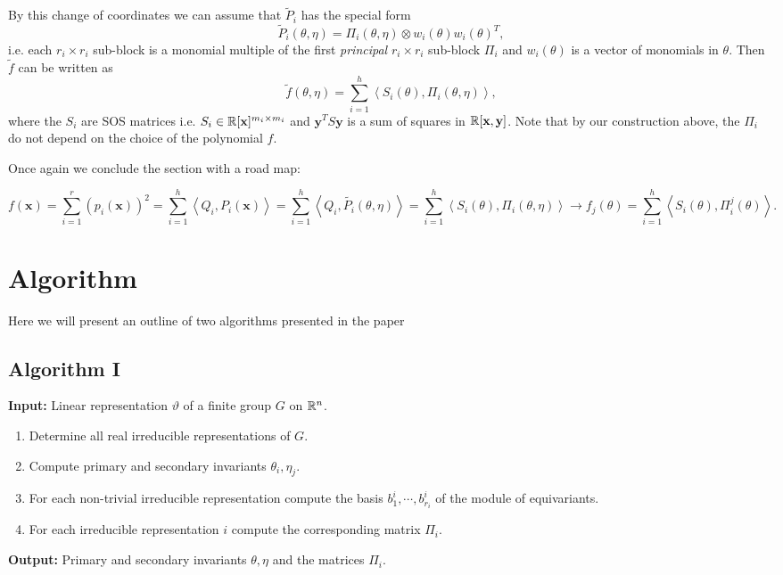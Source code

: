 \documentclass[]{article}
\begin{document}
By this change of coordinates we can assume that $\tilde{P}_i$ has the special form 
\[
    \tilde{P}_i(\theta,\eta)=\Pi_i(\theta,\eta)\otimes w_i(\theta) w_i(\theta)^T,
\]
i.e. each $r_i\times r_i$ sub-block is a monomial multiple of the first \textit{principal} $r_i\times r_i$ sub-block $\Pi_i$ and $w_i(\theta)$ is a vector of monomials in $\theta$. Then $\tilde{f}$ can be written as 
\[
    \tilde{f}(\theta, \eta)=\sum_{i=1}^h\left<S_i(\theta),\Pi_i(\theta,\eta)\right>,
\]
where the $S_i$ are SOS matrices i.e. $S_i\in \mathbb R[\mathbf{x}]^{m_i\times m_i}$ and $\mathbf{y}^TS\textbf{y}$ 
is a sum of squares in $\mathbb R[\textbf{x},\textbf{y}]$. Note that by our construction above, the $\Pi_i$ do not depend on the choice of the polynomial $f$.

Once again we conclude the section with a road map:

\[f(\mathbf{x}) = \sum_{i= 1}^{r} (p_i(\mathbf{x}))^2 
                = \sum_{i=1}^{h}\left<Q_i,P_i(\mathbf{x})\right> 
                = \sum_{i=1}^{h}\left<Q_i,\tilde{P_i}(\theta,\eta)\right>
                = \sum_{i=1}^{h}\left<S_i(\theta),\Pi_i(\theta,\eta)\right> 
                \rightarrow f_j(\theta) = \sum_{i=1}^{h}\left<S_i(\theta),\Pi_i^j(\theta)\right> . \]

\section*{Algorithm}
Here we will present an outline of two algorithms presented in the paper
\subsection*{Algorithm I}


\textbf{Input:} Linear representation $\vartheta$ of a finite group $G$ on $\mathbb R^n$.

\begin{enumerate}
    \item Determine all real irreducible representations of $G$.
    \item Compute primary and secondary invariants $\theta_i,\eta_j$. 
    \item For each non-trivial irreducible representation compute the basis $b_1^i,\cdots, b_{r_i}^i$ of the module of equivariants.
    \item For each irreducible representation $i$ compute the corresponding matrix $\Pi_i$.
\end{enumerate}
\noindent
\textbf{Output:} Primary and secondary invariants $\theta,\eta$ and the matrices $\Pi_i$.
\end{document}

